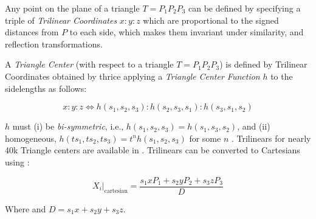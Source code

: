Any point on the plane of a triangle $T=P_1P_2P_3$ can be defined by specifying a triple of {\em Trilinear Coordinates} $x:y:z$ which are proportional to the signed distances from $P$ to each side, which makes them invariant under similarity, and reflection transformations.

A {\em Triangle Center} (with respect to a triangle $T={P_1}{P_2}{P_3}$) is defined by Trilinear Coordinates obtained by thrice applying a {\em Triangle Center Function} $h$ to the sidelengths as follows:
 
\begin{equation}
\label{eqn:ftrilins}
    x:y:z {\iff} h(s_1,s_2,s_3):h(s_2,s_3,s_1):h(s_3,s_1,s_2)
\end{equation}

$h$ must (i) be {\em bi-symmetric}, i.e., $h(s_1,s_2,s_3)=h(s_1,s_3,s_2)$, and (ii) homogeneous, $h(t s_1, t s_2, t s_3)=t^n h(s_1,s_2,s_3)$ for some $n$ \cite{kimberling1993_rocky}. Trilinears for nearly 40k Triangle centers are available in \cite{etc}. Trilinears can be converted to Cartesians using \cite{mw}:
  
\begin{equation}
\label{eqn:trilin-cartesian}
X_i|_{\text{cartesian}}=\frac{s_1 x P_1 + s_2 y P_2 + s_3 z P_3}{D}
\end{equation}

Where and $D={s_1}x+{s_2}y+{s_3}z$.
